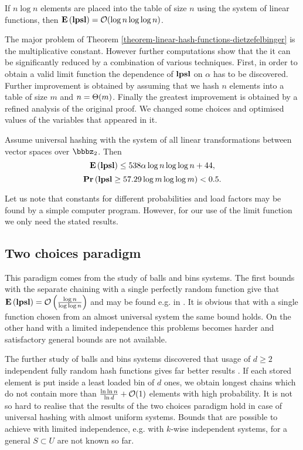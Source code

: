 \begin{theorem}
\label{theorem-linear-hash-functions-dietzefelbinger}
If $n \log n$ elements are placed into the table of size $n$ using the system of linear functions, then $\mathbf{E}\left(\mathbf{lpsl}\right) = \mathcal{O}(\log n \log \log n)$. 
\end{theorem}

The major problem of Theorem \ref{theorem-linear-hash-functions-dietzefelbinger} is the multiplicative constant. However further computations show that the it can be significantly reduced by a combination of various techniques. First, in order to obtain a valid limit function the dependence of $\mathbf{lpsl}$ on $\alpha$ has to be discovered. Further improvement is obtained by assuming that we hash $n$ elements into a table of size $m$ and $n = \mathrm{\Theta}(m)$. Finally the greatest improvement is obtained by a refined analysis of the original proof. We changed some choices and optimised values of the variables that appeared in it.

\begin{theorem}
Assume universal hashing with the system of all linear transformations between vector spaces over $\bbbz_2$. Then $$\mathbf{E}\left(\mathbf{lpsl}\right) \leq 538 \alpha \log n \log \log n + 44,$$ $$\mathbf{Pr}\left(\mathbf{lpsl} \geq 57.29 \log m \log \log m\right) < 0.5.$$
\end{theorem}

Let us note that constants for different probabilities and load factors may be found by a simple computer program. However, for our use of the limit function we only need the stated results.

\subsection{Two choices paradigm}
This paradigm comes from the study of balls and bins systems. The first bounds with the separate chaining with a single perfectly random function give that $\mathbf{E}\left(\mathbf{lpsl}\right) = \mathcal{O}\left(\frac{\log n}{\log \log n}\right)$ and may be found e.g. in \cite{DBLP:books/sp/Mehlhorn84}. It is obvious that with a single function chosen from an almost universal system the same bound holds. On the other hand with a limited independence this problems becomes harder and satisfactory general bounds are not available.

The further study of balls and bins systems discovered that usage of $d \geq 2$ independent fully random hash functions gives far better results \cite{DBLP:conf/stoc/AzarBKU94}. If each stored element is put inside a least loaded bin of $d$ ones, we obtain longest chains which do not contain more than $\frac{\ln \ln n}{\ln d} + \mathcal{O}(1)$ elements with high probability. It is not so hard to realise that the results of the two choices paradigm hold in case of universal hashing with almost uniform systems. Bounds that are possible to achieve with limited independence, e.g. with $k$-wise independent systems, for a general $S \subset U$ are not known so far.

